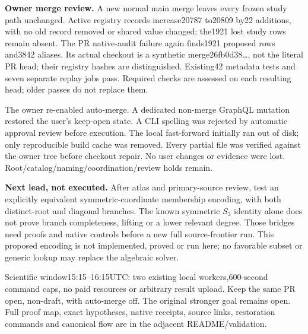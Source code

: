 \documentclass[11pt]{article}
\begin{document}
\textbf{Owner merge review.} A new normal main merge leaves every frozen study
path unchanged. Active registry records increase20787 to20809 by22 additions,
with no old record removed or shared value changed; the1921 lost study rows
remain absent. The PR native-audit failure again finds1921 proposed rows and3842
aliases. Its actual checkout is a synthetic merge26fb0d38\ldots, not the literal
PR head; their registry hashes are distinguished. Existing42 metadata tests and
seven separate replay jobs pass. Required checks are assessed on each resulting
head; older passes do not replace them.

The owner re-enabled auto-merge. A dedicated non-merge GraphQL mutation restored
the user's keep-open state. A CLI spelling was rejected by automatic approval
review before execution. The local fast-forward initially ran out of disk;
only reproducible build cache was removed. Every partial file was verified
against the owner tree before checkout repair. No user changes or evidence
were lost. Root/catalog/naming/coordination/review holds remain.

\textbf{Next lead, not executed.} After atlas and primary-source review, test
an explicitly equivalent symmetric-coordinate membership encoding, with both
distinct-root and diagonal branches. The known symmetric $S_3$ identity alone
does not prove branch completeness, lifting or a lower relevant degree. Those
bridges need proofs and native controls before a new full source-frontier run.
This proposed encoding is not implemented, proved or run here; no favorable
subset or generic lookup may replace the algebraic solver.

Scientific window15:15--16:15UTC: two existing local workers,600-second command
caps, no paid resources or arbitrary result upload. Keep the same PR open,
non-draft, with auto-merge off. The original stronger goal remains open.
\small Full proof map, exact hypotheses, native receipts, source links,
restoration commands and canonical flow are in the adjacent README/validation.
\end{document}

